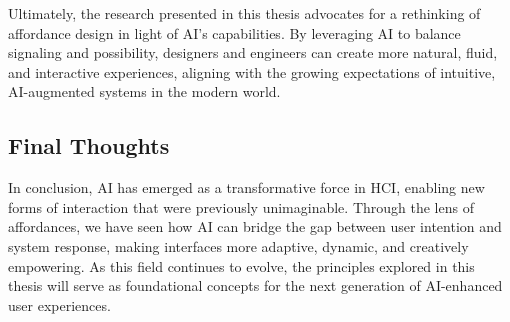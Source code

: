 Ultimately, the research presented in this thesis advocates for a rethinking of affordance design in light of AI's capabilities.
By leveraging AI to balance signaling and possibility, designers and engineers can create more natural, fluid, and interactive experiences, aligning with the growing expectations of intuitive, AI-augmented systems in the modern world.

\subsection{Final Thoughts}
In conclusion, AI has emerged as a transformative force in HCI, enabling new forms of interaction that were previously unimaginable.
Through the lens of affordances, we have seen how AI can bridge the gap between user intention and system response, making interfaces more adaptive, dynamic, and creatively empowering. As this field continues to evolve, the principles explored in this thesis will serve as foundational concepts for the next generation of AI-enhanced user experiences.